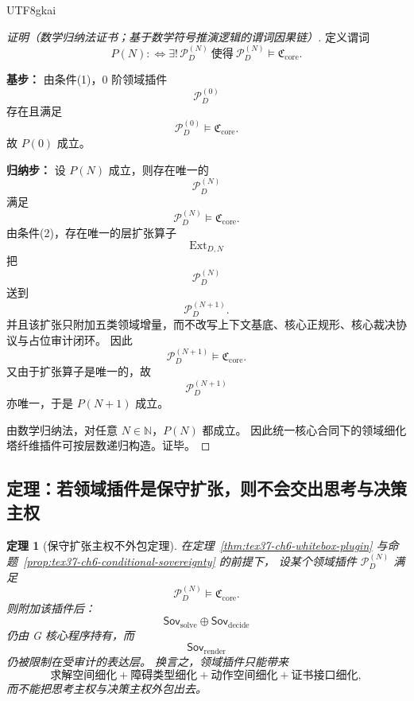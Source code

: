 \documentclass[12pt]{article}
\newtheorem{theorem}{定理}[section]
\newcommand{\NN}{\mathbb{N}}
\begin{document}
\begin{CJK*}{UTF8}{gkai}
\begin{proof}[证明（数学归纳法证书；基于数学符号推演逻辑的谓词因果链）]
定义谓词
\[
  P(N)
  :
  \Longleftrightarrow
  \exists!\,\mathcal P_D^{(N)}
  \ \text{使得}\
  \mathcal P_D^{(N)}\models \mathfrak C_{\mathrm{core}}.
\]

\textbf{基步：}
由条件(1)，$0$ 阶领域插件
\[
  \mathcal P_D^{(0)}
\]
存在且满足
\[
  \mathcal P_D^{(0)}\models \mathfrak C_{\mathrm{core}}.
\]
故 $P(0)$ 成立。

\textbf{归纳步：}
设 $P(N)$ 成立，则存在唯一的
\[
  \mathcal P_D^{(N)}
\]
满足
\[
  \mathcal P_D^{(N)}\models \mathfrak C_{\mathrm{core}}.
\]
由条件(2)，存在唯一的层扩张算子
\[
  \operatorname{Ext}_{D,N}
\]
把
\[
  \mathcal P_D^{(N)}
\]
送到
\[
  \mathcal P_D^{(N+1)}.
\]
并且该扩张只附加五类领域增量，而不改写上下文基底、核心正规形、核心裁决协议与占位审计闭环。
因此
\[
  \mathcal P_D^{(N+1)}\models \mathfrak C_{\mathrm{core}}.
\]
又由于扩张算子是唯一的，故
\[
  \mathcal P_D^{(N+1)}
\]
亦唯一，于是 $P(N+1)$ 成立。

由数学归纳法，对任意 $N\in\NN$，$P(N)$ 都成立。
因此统一核心合同下的领域细化塔纤维插件可按层数递归构造。证毕。
\end{proof}

\subsection{定理：若领域插件是保守扩张，则不会交出思考与决策主权}
\label{subsec:tex37-ch7-theorem}

\begin{theorem}[保守扩张主权不外包定理]
\label{thm:tex37-ch7-conservative}
在定理~\ref{thm:tex37-ch6-whitebox-plugin} 与命题~\ref{prop:tex37-ch6-conditional-sovereignty} 的前提下，
设某个领域插件 $\mathcal P_D^{(N)}$ 满足
\[
  \mathcal P_D^{(N)}\models \mathfrak C_{\mathrm{core}}.
\]
则附加该插件后：
\[
  \mathsf{Sov}_{\mathrm{solve}}
  \oplus
  \mathsf{Sov}_{\mathrm{decide}}
\]
仍由 G 核心程序持有，而
\[
  \mathsf{Sov}_{\mathrm{render}}
\]
仍被限制在受审计的表达层。
换言之，领域插件只能带来
\[
  \text{求解空间细化}
  +
  \text{障碍类型细化}
  +
  \text{动作空间细化}
  +
  \text{证书接口细化},
\]
而不能把思考主权与决策主权外包出去。
\end{theorem}


\end{CJK*}
\end{document}
